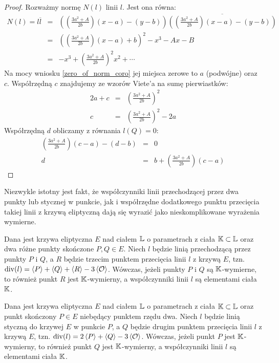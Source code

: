 \begin{proof}
Rozważmy normę $N(l)$ linii $l$. Jest ona równa:
\begin{eqnarray*}
N(l) = l\overline{l}
& = & \left(\left(\frac{3a^2 + A}{2b}\right)(x - a) - (y - b)\right)
      \overline{
      \left(\left(\frac{3a^2 + A}{2b}\right)(x - a) - (y - b)\right)
      } \\
& = & \left(\left(\frac{3a^2+A}{2b}\right)(x-a) + b\right)^2 - x^3 - Ax - B \\
& = & -x^3 + \left(\frac{3a^2+A}{2b}\right)^2x^2 + \cdots
\end{eqnarray*}
Na mocy wniosku \ref{zero_of_norm_coro}
jej miejsca zerowe to $a$ (podwójne) oraz $c$.
Współrzędną $c$ znajdujemy ze wzorów Viete'a na sumę pierwiastków:
\begin{eqnarray*}
2a + c & = & \left(\frac{3a^2+A}{2b}\right)^2 \\
     c & = & \left(\frac{3a^2+A}{2b}\right)^2 - 2a
\end{eqnarray*}
Współrzędną $d$ obliczamy z równania $l(Q) = 0$:
\begin{eqnarray*}
\left(\frac{3a^2 + A}{2b}\right)(c - a) - (d - b) & = & 0 \\
d & = & b + \left(\frac{3a^2 + A}{2b}\right)(c - a)
\end{eqnarray*}
\end{proof}

Niezwykle istotny jest fakt,
że współczynniki linii przechodzącej przez dwa punkty
lub stycznej w punkcie,
jak i współrzędne dodatkowego punktu przecięcia
takiej linii z krzywą eliptyczną dają się wyrazić
jako nieskomplikowane wyrażenia wymierne.

\begin{fact}
Dana jest krzywa eliptyczna $E$ nad ciałem $\mathbb{L}$
o parametrach z ciała $\mathbb{K} \subset \mathbb{L}$
oraz dwa różne punkty skończone $P, Q \in E$.
Niech $l$ będzie linią przechodzącą przez punkty $P$ i $Q$,
a $R$ będzie trzecim punktem przecięcia linii $l$ z krzywą $E$,
tzn. $\operatorname{div}(l) = \left\langle P\right\rangle + \left\langle Q\right\rangle + \left\langle R\right\rangle - 3\left\langle\mathcal{O}\right\rangle$.
Wówczas, jeżeli punkty $P$ i $Q$ są $\mathbb{K}$-wymierne,
to również punkt $R$ jest $\mathbb{K}$-wymierny,
a współczynniki linii $l$ są elementami ciała $\mathbb{K}$.
\end{fact}

\begin{fact}
Dana jest krzywa eliptyczna $E$ nad ciałem $\mathbb{L}$
o parametrach z ciała $\mathbb{K} \subset \mathbb{L}$
oraz punkt skończony $P \in E$ niebędący punktem rzędu dwa.
Niech $l$ będzie linią styczną do krzywej $E$ w punkcie $P$,
a $Q$ będzie drugim punktem przecięcia linii $l$ z krzywą $E$,
tzn. $\operatorname{div}(l) = 2\left\langle P\right\rangle + \left\langle Q\right\rangle - 3\left\langle\mathcal{O}\right\rangle$.
Wówczas, jeżeli punkt $P$ jest $\mathbb{K}$-wymierny,
to również punkt $Q$ jest $\mathbb{K}$-wymierny,
a współczynniki linii $l$ są elementami ciała $\mathbb{K}$.
\end{fact}

